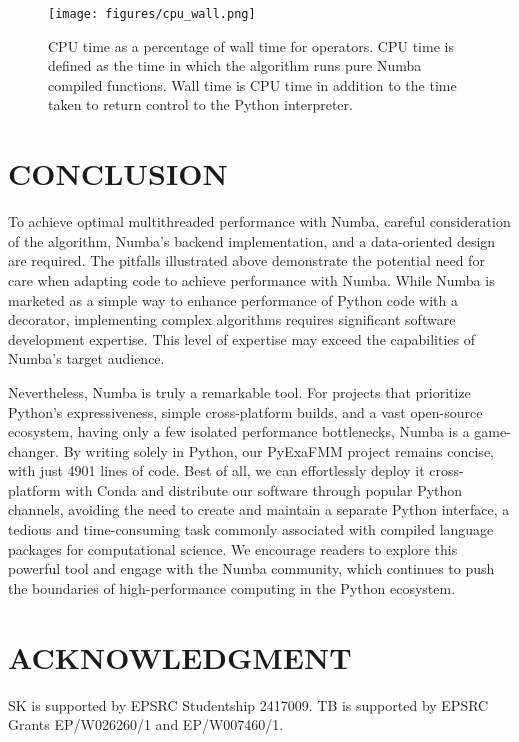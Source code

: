 \documentclass{IEEEcsmag}
\begin{document}
 \begin{figure}
	\centerline{\texttt{[image: figures/cpu\_wall.png]}}
    \caption{CPU time as a percentage of wall time for operators. CPU time is defined as the time in which the algorithm runs pure Numba compiled functions. Wall time is CPU time in addition to the time taken to return control to the Python interpreter. } 
	\label{fig:cpu_wall}
\end{figure}

\section{CONCLUSION}

To achieve optimal multithreaded performance with Numba, careful consideration of the algorithm, Numba's backend implementation, and a data-oriented design are required. The pitfalls illustrated above demonstrate the potential need for care when adapting code to achieve performance with Numba. While Numba is marketed as a simple way to enhance performance of Python code with a decorator, implementing complex algorithms requires significant software development expertise. This level of expertise may exceed the capabilities of Numba's target audience.

Nevertheless, Numba is truly a remarkable tool. For projects that prioritize Python's expressiveness, simple cross-platform builds, and a vast open-source ecosystem, having only a few isolated performance bottlenecks, Numba is a game-changer. By writing solely in Python, our PyExaFMM project remains concise, with just 4901 lines of code. Best of all, we can effortlessly deploy it cross-platform with Conda and distribute our software through popular Python channels, avoiding the need to create and maintain a separate Python interface, a tedious and time-consuming task commonly associated with compiled language packages for computational science.
We encourage readers to explore this powerful tool and engage with the Numba community, which continues to push the boundaries of high-performance computing in the Python ecosystem.

\section{ACKNOWLEDGMENT}

SK is supported by EPSRC Studentship 2417009. TB is supported by EPSRC Grants EP/W026260/1 and EP/W007460/1.


\end{document}
